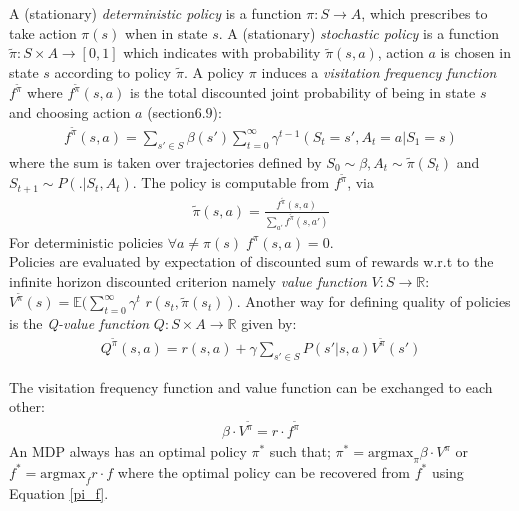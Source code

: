 \documentclass[runningheads,a4paper]{llncs}
\begin{document}
A (stationary) \textit{deterministic policy} is a function $\pi: S \longrightarrow A$, which prescribes to take action $\pi(s)$ when in state $s$. A (stationary) \textit{stochastic policy} is a function $\tilde{\pi}: S \times A \longrightarrow [0,1]$ which indicates with probability $\tilde{\pi} (s,a)$, action $a$ is chosen in state $s$ according to policy $\tilde{\pi}$. A policy $\pi$ induces a \textit{visitation frequency function} $f^{\tilde{\pi}}$ where $f^{\tilde{\pi}}(s,a)$ is the total discounted joint probability of being in state $s$ and choosing action $a$ \cite{Puterman1994} (section$6.9$):
\begin{align*}
f^{\tilde{\pi}}(s, a) = \sum_{s' \in S} \beta(s') \sum_{t=0}^{\infty} \gamma^{t-1}(S_t = s', A_t = a | S_1 = s)
\end{align*}
where the sum is taken over trajectories defined by $S_0 \sim \beta, A_t \sim \tilde{\pi}(S_t)$ and $S_{t+1} \sim P(.|S_t,A_t)$. The policy is computable from $f^{\tilde{\pi}}$, via 
\begin{align}\label{pi_f}
\tilde{\pi}(s,a) = \frac{f^{\tilde{\pi}}(s, a)}{\sum_{a'} f^{\tilde{\pi}} (s,a')}
\end{align}
For deterministic policies $\forall a \neq \pi(s) \; f^{\pi}(s,a)= 0$.\\
Policies are evaluated by expectation of discounted sum of rewards w.r.t to the infinite horizon discounted criterion namely \textit{value function} $V: S \longrightarrow \mathbb{R}$: 
$V^{\tilde{\pi}}(s) = \mathbb{E}(\sum_{t=0}^{\infty} \gamma^{t}$ $r(s_t, \tilde{\pi}(s_t))$. %
Another way for defining quality of policies is the \textit{Q-value function}   $Q: S \times A \longrightarrow \mathbb{R}$ given by:
\begin{align}\label{q-v}
Q^{\tilde{\pi}}(s, a) = r(s, a) + \gamma \sum_{s' \in S} P(s'|s,a)V^{\tilde{\pi}}(s')
\end{align}

The visitation frequency function and value function can be exchanged to each other:
\begin{align}\label{f-v}
\beta \cdot V^{\tilde{\pi}} = r \cdot f^{\tilde{\pi}}
\end{align}
An MDP always has an optimal policy $\pi^*$ such that; $\pi^* = \text{argmax}_{\pi} \beta \cdot V^{\pi}$ or $f^{*} = \text{argmax}_{f} r \cdot f$ where the optimal policy can be recovered from $f^*$ using Equation \ref{pi_f}. 
\end{document}
